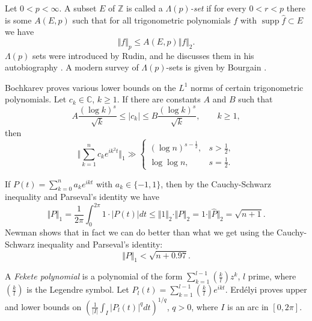 \documentclass{article}
\newcommand{\norm}[1]{\Vert #1 \Vert}
\newcommand{\supp}{\mathop{\mathrm{supp}}}
\begin{document}
Let $0< p <\infty$. A subset $E$ of $\mathbb{Z}$ is called a {\em $\Lambda(p)$-set} if 
for every $0<r<p$ there is some $A(E,p)$ such that for all trigonometric polynomials $f$ with $\supp \hat{f} \subset E$ we have
\[
\norm{f}_p \leq A(E,p) \norm{f}_2.
\]
$\Lambda(p)$ sets were introduced by Rudin, and he discusses them in his autobiography \cite[Chapter~28]{MR1413303}. 
A modern survey of $\Lambda(p)$-sets is given by Bourgain \cite{bourgain}.

Bochkarev \cite{MR2301609} proves various lower bounds on the $L^1$ norms of certain trigonometric polynomials.
Let $c_k \in \mathbb{C}$, $k \geq 1$. 
If there are constants $A$ and $B$ such that
\[
A\frac{(\log k)^s}{\sqrt{k}} \leq |c_k| \leq B\frac{(\log k)^s}{\sqrt{k}}, \qquad k \geq 1,
\]
then \cite[p.~58, Theorem~19]{MR2301609}
\[
\norm{\sum_{k=1}^n c_k e^{ik^2 t}}_1 \gg 
\begin{cases}
(\log n)^{s-\frac{1}{2}},&s>\frac{1}{2},\\
\log \log n,&s=\frac{1}{2}.
\end{cases}
\]

If $P(t)=\sum_{k=0}^n a_k e^{ikt}$ with $a_k \in \{-1,1\}$, then by the Cauchy-Schwarz inequality and Parseval's identity we have
\[
\norm{P}_1=\frac{1}{2\pi}\int_0^{2\pi} 1 \cdot |P(t)| dt \leq \norm{1}_2\cdot \norm{P}_2 = 1\cdot \norm{\hat{P}}_2 = \sqrt{n+1}.
\]
Newman \cite{newman} shows that in fact we can do better than what we get using the Cauchy-Schwarz inequality and Parseval's identity:
\[
\norm{P}_1 < \sqrt{n+0.97}.
\]

A {\em Fekete polynomial} is a polynomial of the form $\sum_{k=1}^{l-1} \left( \frac{k}{l} \right) z^k$, $l$ prime, where
$\left( \frac{k}{l} \right)$ is the Legendre symbol. Let $P_l(t)=\sum_{k=1}^{l-1} \left( \frac{k}{l} \right) e^{ikt}$. Erd{\'e}lyi \cite{MR2899817}
proves upper and lower bounds on $\left( \frac{1}{|I|} \int_I |P_l(t)|^q dt \right)^{1/q}$, $q>0$, where $I$ is an arc in $[0,2\pi]$.



\end{document}
